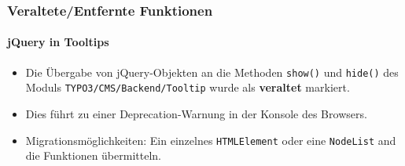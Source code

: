 %

\begin{frame}[fragile]
	\frametitle{Veraltete/Entfernte Funktionen}
	\framesubtitle{jQuery in Tooltips}


	\begin{itemize}
		\item Die Übergabe von jQuery-Objekten an die Methoden \texttt{show()} und \texttt{hide()}
			des Moduls \texttt{TYPO3/CMS/Backend/Tooltip} wurde als
			\textbf{veraltet} markiert.
		\item Dies führt zu einer Deprecation-Warnung in der Konsole des Browsers.
		\item Migrationsmöglichkeiten:
			Ein einzelnes \texttt{HTMLElement} oder eine \texttt{NodeList} and die
			Funktionen übermitteln.
	\end{itemize}

\end{frame}

